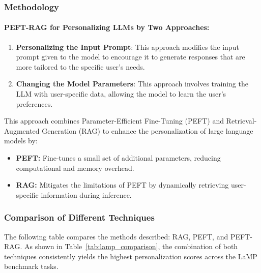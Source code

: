 \documentclass[12pt, a4paper, oneside]{report}
\begin{document}
\subsubsection{Methodology}

\paragraph{PEFT-RAG for Personalizing LLMs by Two Approaches:}

\begin{enumerate}
  \item \textbf{Personalizing the Input Prompt}: This approach modifies the input prompt given to the model to encourage it to generate responses that are more tailored to the specific user's needs.
  \item \textbf{Changing the Model Parameters}: This approach involves training the LLM with user-specific data, allowing the model to learn the user's preferences.
\end{enumerate}

This approach combines Parameter-Efficient Fine-Tuning (PEFT) and Retrieval-Augmented Generation (RAG) to enhance the personalization of large language models by:

\begin{itemize}[noitemsep]
    \item \textbf{PEFT:} Fine-tunes a small set of additional parameters, reducing computational and memory overhead.

    \item \textbf{RAG:} Mitigates the limitations of PEFT by dynamically retrieving user-specific information during inference.
\end{itemize}
\newpage
\subsubsection{Comparison of Different Techniques}

The following table compares the methods described: RAG, PEFT, and PEFT-RAG. As shown in Table~\ref{tab:lamp_comparison}, the combination of both techniques consistently yields the highest personalization scores across the LaMP benchmark tasks.
\end{document}
